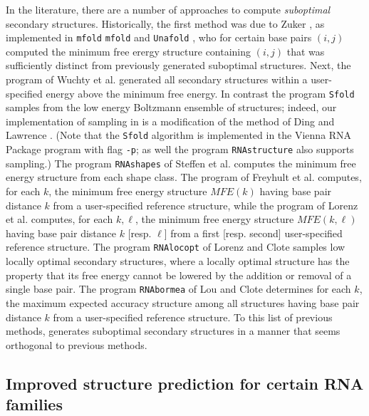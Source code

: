 In the literature, there are a number of approaches to compute
{\em suboptimal} secondary structures. Historically, the first
method was due to Zuker \citep{Zuk89a}, as implemented in {\tt mfold}
{\tt mfold} \citep{Zuk89a} and {\tt Unafold} \citep{Markham.mmb08},
who for certain base pairs $(i,j)$ computed the minimum
free erergy structure containing $(i,j)$ that was sufficiently distinct
from previously generated suboptimal structures.
Next, the program \rnasub of Wuchty et al.
\citep{wuchtyFontanaHofackerSchuster} generated all secondary structures
within a user-specified energy above the minimum free energy.
In contrast the program {\tt Sfold} \citep{Ding.nar03} samples from
the low energy Boltzmann ensemble of structures; indeed, our implementation
of sampling in {\rnahairpin} is a modification of the method of
Ding and Lawrence \citep{Ding.nar03}. (Note that the {\tt Sfold} algorithm
is implemented in the Vienna RNA Package program
\rnasub with flag {\tt -p}; as well the program
{\tt RNAstructure} \citep{mathewsConstraints} also supports sampling.)
The program {\tt RNAshapes} of Steffen et al.
\citep{giegerich:shapesBioinf} computes the minimum free energy structure
from each shape class.
The program \rnabor of Freyhult et al. \citep{Freyhult.b07}
computes, for each $k$,
the minimum free energy structure $MFE(k)$ having base pair
distance $k$ from a user-specified reference structure, while the
program \rnatwofold of Lorenz et al. \citep{hofacker:RNAbor2D}
computes, for each $k,\ell$, the minimum free energy structure
$MFE(k,\ell)$ having base pair
distance $k$ [resp. $\ell$] from a first [resp. second]
user-specified reference structure.
The program {\tt RNAlocopt} of Lorenz and Clote  \citep{RNAlocopt}
samples low  locally optimal secondary structures, where a locally
optimal structure has the property that its free energy cannot be lowered
by the addition or removal of a single base pair. The program
{\tt RNAbormea} of Lou and Clote \citep{Clote.bb12} determines
for each $k$, the maximum expected accuracy structure among all structures
having base pair distance $k$ from a user-specified reference structure.
To this list of previous methods, {\rnahairpin} generates suboptimal
secondary structures in a manner that seems orthogonal to previous methods.

\subsection{Improved structure prediction for certain RNA families}



